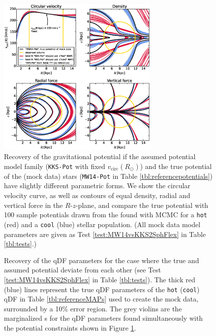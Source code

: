 
\begin{figure}[!htbp]
\centering
\includegraphics[width=0.7\textwidth]{figs/MW14vsKKS2SphFlex_contours_compare.eps}
\caption{Recovery of the gravitational potential if the assumed potential model family (\texttt{KKS-Pot} with fixed $v_\text{circ}(R_\odot)$) and the true potential of the (mock data) stars (\texttt{MW14-Pot} in Table \ref{tbl:referencepotentials}) have slightly different parametric forms. We show the circular velocity curve, as well as contours of equal density, radial and vertical force in the $R$-$z$-plane, and compare the true potential with 100 sample potentials drawn from the \pdf{} found with MCMC for a \texttt{hot} (red) and a \texttt{cool} (blue) stellar population. (All mock data model parameters are given as Test \ref{test:MW14vsKKS2SphFlex} in Table \ref{tbl:tests}.)}
\label{fig:MW14vsKKS2SphFlex}
\end{figure}

\begin{figure}[!htb]
\caption{Recovery of the qDF parameters for the case where the true and assumed potential deviate from each other (see Test \ref{test:MW14vsKKS2SphFlex} in Table \ref{tbl:tests}). The thick red (blue) lines represent the true qDF parameters of the \texttt{hot} (\texttt{cool}) qDF in Table \ref{tbl:referenceMAPs} used to create the mock data, surrounded by a 10\% error region. The grey violins are the marginalized \pdf{}s for the qDF parameters found simultaneously with the potential constraints shown in Figure \ref{fig:MW14vsKKS2SphFlex}.}
\label{fig:MW14vsKKS2SphFlex_violins}
\end{figure}


